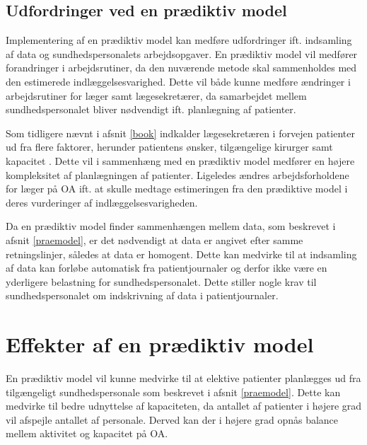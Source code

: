 \subsection{Udfordringer ved en prædiktiv model}
Implementering af en prædiktiv model kan medføre udfordringer ift. indsamling af data og sundhedspersonalets arbejdsopgaver. En prædiktiv model vil medfører forandringer i arbejdsrutiner, da den nuværende metode skal sammenholdes med den estimerede indlæggelsesvarighed. Dette vil både kunne medføre ændringer i arbejdsrutiner for læger samt lægesekretærer, da samarbejdet mellem sundhedspersonalet bliver nødvendigt ift. planlægning af patienter. 


Som tidligere nævnt i afsnit \ref{book} indkalder lægesekretæren i forvejen patienter ud fra flere faktorer, herunder patientens ønsker, tilgængelige kirurger samt kapacitet . Dette vil i sammenhæng med en prædiktiv model medfører en højere kompleksitet af planlægningen af patienter. Ligeledes ændres arbejdsforholdene for læger på OA  ift. at skulle medtage estimeringen fra den prædiktive model i deres vurderinger af indlæggelsesvarigheden. 


Da en prædiktiv model finder sammenhængen mellem data, som beskrevet i afsnit \ref{praemodel}, er det nødvendigt at data er angivet efter samme retningslinjer, således at data er homogent\cite{Kuhn2013}. Dette kan medvirke til at indsamling af data kan forløbe automatisk fra patientjournaler og derfor ikke være en yderligere belastning for sundhedspersonalet. Dette stiller nogle krav til sundhedspersonalet om indskrivning af data i patientjournaler. 


\section{Effekter af en prædiktiv model}
En prædiktiv model vil kunne medvirke til at elektive patienter planlægges ud fra tilgængeligt sundhedspersonale som beskrevet i afsnit \ref{praemodel}. Dette kan medvirke til bedre udnyttelse af kapaciteten, da antallet af patienter i højere grad vil afspejle antallet af personale. Derved kan der i højere grad opnås balance mellem aktivitet og kapacitet på OA. 